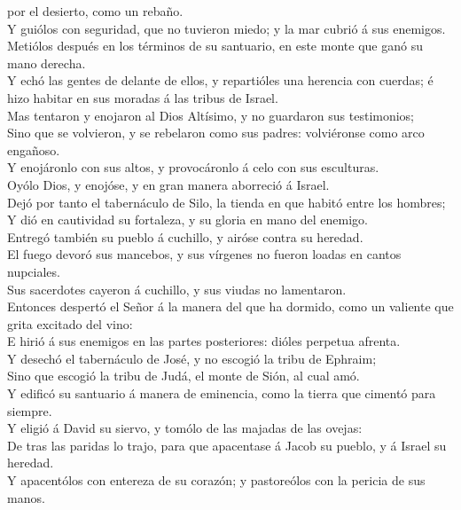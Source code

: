 por el desierto, como un rebaño.\\
 Y guiólos con seguridad, que no tuvieron miedo; y la mar
cubrió á sus enemigos.\\
 Metiólos después en los términos de su santuario, en
este monte que ganó su mano derecha.\\
 Y echó las gentes de delante de ellos, y repartióles una
herencia con cuerdas; é hizo habitar en sus moradas á las tribus de
Israel.\\
 Mas tentaron y enojaron al Dios Altísimo, y no guardaron
sus testimonios;\\
 Sino que se volvieron, y se rebelaron como sus padres:
volviéronse como arco engañoso.\\
 Y enojáronlo con sus altos, y provocáronlo á celo con
sus esculturas.\\
 Oyólo Dios, y enojóse, y en gran manera aborreció á
Israel.\\
 Dejó por tanto el tabernáculo de Silo, la tienda en que
habitó entre los hombres;\\
 Y dió en cautividad su fortaleza, y su gloria en mano
del enemigo.\\
 Entregó también su pueblo á cuchillo, y airóse contra su
heredad.\\
 El fuego devoró sus mancebos, y sus vírgenes no fueron
loadas en cantos nupciales.\\
 Sus sacerdotes cayeron á cuchillo, y sus viudas no
lamentaron.\\
 Entonces despertó el Señor á la manera del que ha
dormido, como un valiente que grita excitado del vino:\\
 E hirió á sus enemigos en las partes posteriores: dióles
perpetua afrenta.\\
 Y desechó el tabernáculo de José, y no escogió la tribu
de Ephraim;\\
 Sino que escogió la tribu de Judá, el monte de Sión, al
cual amó.\\
 Y edificó su santuario á manera de eminencia, como la
tierra que cimentó para siempre.\\
 Y eligió á David su siervo, y tomólo de las majadas de
las ovejas:\\
 De tras las paridas lo trajo, para que apacentase á
Jacob su pueblo, y á Israel su heredad.\\
 Y apacentólos con entereza de su corazón; y pastoreólos
con la pericia de sus manos.

